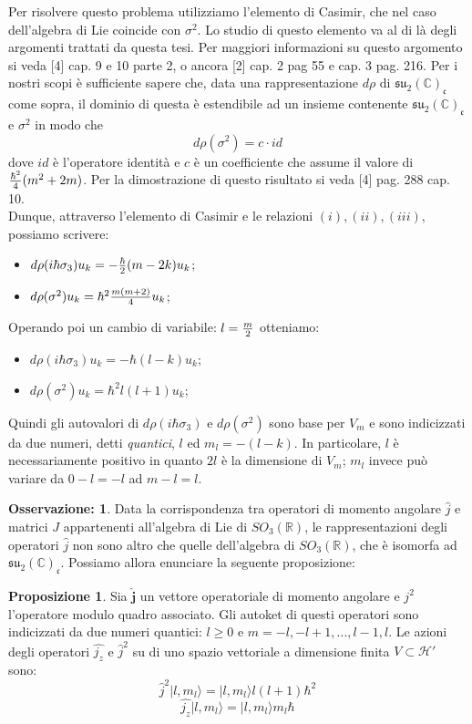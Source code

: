 \documentclass[12pt,a4paper]{report}
\theoremstyle{definition}
\theoremstyle{Theorem}
\newtheorem{Prop}[Def]{Proposizione}
\theoremstyle{definition}
\theoremstyle{definition}
\theoremstyle{definition}
\newtheorem{Obs}[Def]{Osservazione:}
\begin{document}
Per risolvere questo problema utilizziamo l'elemento di Casimir, che nel caso dell'algebra di Lie coincide con $\sigma^2$. Lo studio di questo elemento va al di là degli argomenti trattati da questa tesi. Per maggiori informazioni su questo argomento si veda [4] cap. 9 e 10 parte 2, o ancora [2] cap. 2 pag 55 e cap. 3 pag. 216. Per i nostri scopi è sufficiente sapere che, data una rappresentazione $d\rho$ di $\mathfrak{su_2(\mathbb{C})_c}$ come sopra, il dominio di questa è estendibile ad un insieme contenente $\mathfrak{su_2(\mathbb{C})_c}$ e $\sigma^2$ in modo che
$$d\rho(\sigma^2)=c\cdot id$$ 
dove $id$ è l'operatore identità e $c$ è un coefficiente che assume il valore di ${\hbar^2\over 4}(m^2+2m)$. Per la dimostrazione di questo risultato si veda [4] pag. 288 cap. 10.\\
Dunque, attraverso l'elemento di Casimir e le relazioni $(i),(ii),(iii)$, possiamo scrivere:
	\begin{itemize}
		\centering
		\item $d\rho(i\hbar\sigma_3)u_k=-{\hbar\over 2}(m-2k)u_k$;
		\item $d\rho(\sigma^2)u_k=\hbar^2{m(m+2)\over 4}u_k$;
	\end{itemize}
Operando poi un cambio di variabile: $l={m\over2}$ otteniamo:
\begin{itemize}
	\centering
	\item $d\rho(i\hbar\sigma_3)u_k=-\hbar(l-k)u_k$;
	\item $d\rho(\sigma^2)u_k=\hbar^2l(l+1)u_k$;
\end{itemize}
Quindi gli autovalori di $d\rho(i\hbar\sigma_3)$ e $d\rho(\sigma^2)$ sono base per $V_m$ e sono indicizzati da due numeri, detti \textit{quantici}, $l$ ed $m_l=-(l-k)$. In particolare, $l$ è necessariamente positivo in quanto $2l$ è la dimensione di $V_m$; $m_l$ invece può variare da $0-l=-l$ ad $m-l=l$.
\begin{Obs}
	Data la corrispondenza tra operatori di momento angolare $\hat{j}$ e matrici $J$ appartenenti all'algebra di Lie di $SO_3(\mathbb{R})$, le rappresentazioni degli operatori $\hat{j}$ non sono altro che quelle dell'algebra di $SO_3(\mathbb{R})$, che è isomorfa ad $\mathfrak{su_2(\mathbb{C})_c}$.
	Possiamo allora enunciare la seguente proposizione:
\end{Obs}
\begin{Prop}
	Sia $\hat{\textbf{j}}$ un vettore operatoriale di momento angolare e $j^2$ l'operatore modulo quadro associato. Gli autoket di questi operatori sono indicizzati da due numeri quantici: $l\geq0$ e $m=-l,-l+1,...,l-1,l$. Le azioni degli operatori $\hat{j_z}$ e $\hat{j}^2$ su di uno spazio vettoriale a dimensione finita $V\subset \mathcal{H'}$ sono:
	$$\hat{j}^2|l,m_l\rangle=|l,m_l\rangle l(l+1)\hbar^2$$ 
	$$\hat{j_z}|l,m_l\rangle=|l,m_l\rangle m_l\hbar$$
\end{Prop}
\end{document}
